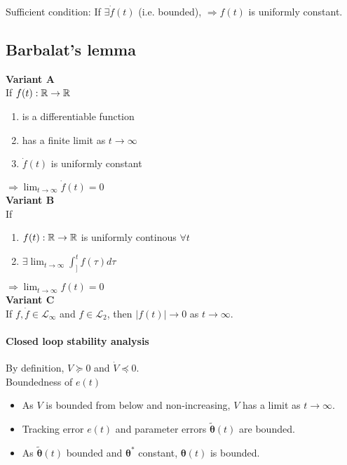 Sufficient condition:
If $\exists \dot{f}(t)$ (i.e. bounded),
$\Rightarrow f(t)$ is uniformly constant.

\subsection{Barbalat's lemma}
\textbf{Variant A}\\
If $f(t): \mathbb{R} \rightarrow \mathbb{R}$
\begin{enumerate}
\item is a differentiable function
\item has a finite limit as $t \rightarrow \infty$ 
\item $\dot{f}(t)$ is uniformly constant
\end{enumerate}
$\Rightarrow \lim_{t \rightarrow \infty} \dot{f}(t) = 0$\\

\textbf{Variant B}\\
If
\begin{enumerate}
\item $f(t): \mathbb{R} \rightarrow \mathbb{R}$ is uniformly continous $\forall t$
\item $\exists \lim_{t \rightarrow \infty} \int_]^t f(\tau) d\tau$
\end{enumerate}
$\Rightarrow \lim_{t \rightarrow \infty} f(t) = 0$\\

\textbf{Variant C}\\
If $f, \dot{f} \in \mathcal{L}_\infty$ 
and $f \in \mathcal{L}_2$,
then  $|f(t)| \rightarrow 0$ as $t \rightarrow \infty$.

\paragraph{Closed loop stability analysis}
By definition, $V \succeq 0$ and $\dot{V} \preceq 0$.\\

Boundedness of $e(t)$
\begin{itemize}
\item As $V$ is bounded from below and non-increasing,
    $V$ has a limit as $t \rightarrow \infty$.
\item Tracking error $e(t)$ and parameter errors $ \tilde{\bm{\theta}}(t)$
    are bounded.
\item As $\tilde{\bm{\theta}}(t)$ bounded and $\bm{\theta}^*$ constant,
    $\bm{\theta}(t)$ is bounded.
\end{itemize}~

